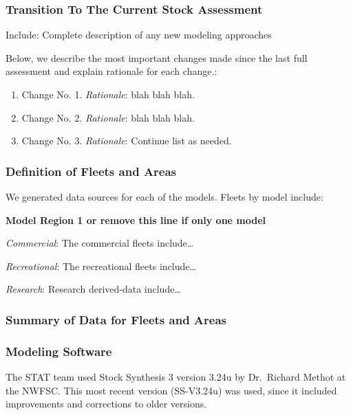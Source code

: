 \documentclass[12pt,]{article}
\begin{document}
\subsubsection{Transition To The Current Stock
Assessment}\label{transition-to-the-current-stock-assessment}

Include: Complete description of any new modeling approaches

Below, we describe the most important changes made since the last full
assessment and explain rationale for each change.:

\begin{enumerate}
\def\labelenumi{\arabic{enumi}.}
\item
  Change No. 1. \emph{Rationale}: blah blah blah.
\item
  Change No. 2. \emph{Rationale}: blah blah blah.
\item
  Change No. 3. \emph{Rationale}: Continue list as needed.
\end{enumerate}

\subsubsection{Definition of Fleets and
Areas}\label{definition-of-fleets-and-areas}

We generated data sources for each of the models. Fleets by model
include:

\textbf{Model Region 1 or remove this line if only one model}

\emph{Commercial}: The commercial fleets include\ldots{}

\emph{Recreational}: The recreational fleets include\ldots{}

\emph{Research}: Research derived-data include\ldots{}

\subsubsection{Summary of Data for Fleets and
Areas}\label{summary-of-data-for-fleets-and-areas}

\subsubsection{Modeling Software}\label{modeling-software}

The STAT team used Stock Synthesis 3 version 3.24u by Dr.~Richard Methot
at the NWFSC. This most recent version (SS-V3.24u) was used, since it
included improvements and corrections to older versions.
\end{document}
